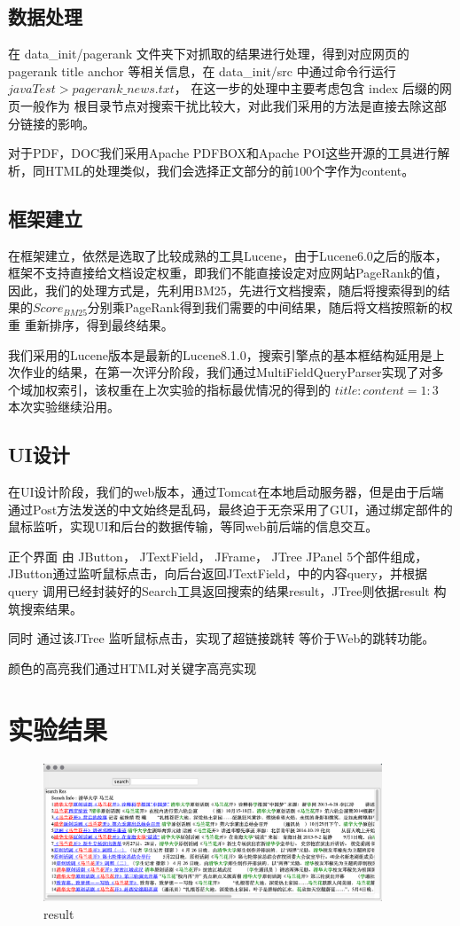 \documentclass{article}
\begin{document}
		\subsection{数据处理}
			在 data\_init/pagerank 文件夹下对抓取的结果进行处理，得到对应网页的 pagerank title anchor 等相关信息，在 data\_init/src 中通过命令行运行 $java Test > pagerank\_news.txt $， 在这一步的处理中主要考虑包含 index 后缀的网页一般作为 根目录节点对搜索干扰比较大，对此我们采用的方法是直接去除这部分链接的影响。
			\par
			对于PDF，DOC我们采用Apache PDFBOX和Apache POI这些开源的工具进行解析，同HTML的处理类似，我们会选择正文部分的前100个字作为content。

		\subsection{框架建立}
			在框架建立，依然是选取了比较成熟的工具Lucene，由于Lucene6.0之后的版本，框架不支持直接给文档设定权重，即我们不能直接设定对应网站PageRank的值，因此，我们的处理方式是，先利用BM25，先进行文档搜索，随后将搜索得到的结果的$Score_{BM25}$分别乘PageRank得到我们需要的中间结果，随后将文档按照新的权重 重新排序，得到最终结果。

			\par 我们采用的Lucene版本是最新的Lucene8.1.0，搜索引擎点的基本框结构延用是上次作业的结果，在第一次评分阶段，我们通过MultiFieldQueryParser实现了对多个域加权索引，该权重在上次实验的指标最优情况的得到的 $title:content = 1:3$ 本次实验继续沿用。
		\subsection{UI设计} 
			在UI设计阶段，我们的web版本，通过Tomcat在本地启动服务器，但是由于后端通过Post方法发送的中文始终是乱码，最终迫于无奈采用了GUI，通过绑定部件的鼠标监听，实现UI和后台的数据传输，等同web前后端的信息交互。
			\par 
			正个界面 由 JButton， JTextField， JFrame， JTree JPanel 5个部件组成，JButton通过监听鼠标点击，向后台返回JTextField，中的内容query，并根据 query 调用已经封装好的Search工具返回搜索的结果result，JTree则依据result 构筑搜索结果。
			\par 
			同时 通过该JTree 监听鼠标点击，实现了超链接跳转 等价于Web的跳转功能。
			\par 颜色的高亮我们通过HTML对关键字高亮实现
	\section{实验结果}
	\begin{figure}[H]
	\centering
	\includegraphics[width=0.9\textwidth]{1.png} 
	\caption{result} 
	\label{img} 
	\end{figure}
\end{document}
